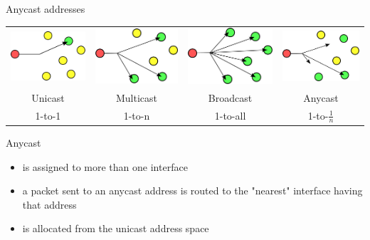 \begin{frame}{Anycast addresses}
  \begin{tabular}{cccc}
    \includegraphics[width=.2\columnwidth]{unicast}&
    \includegraphics[width=.2\columnwidth]{multicast}&
    \includegraphics[width=.2\columnwidth]{broadcast}&
    \includegraphics[width=.2\columnwidth]{anycast}\\
    Unicast&Multicast&Broadcast&Anycast\\
    1-to-1&1-to-n&1-to-all&1-to-$\frac{1}{n}$\\
  \end{tabular}
  \begin{iblock}{Anycast}
    \begin{itemize}
    \item is assigned to more than one interface
    \item a packet sent to an anycast address is routed to the "nearest" interface having
      that address
    \item is allocated from the unicast address space
    \end{itemize}
  \end{iblock}
\end{frame}


